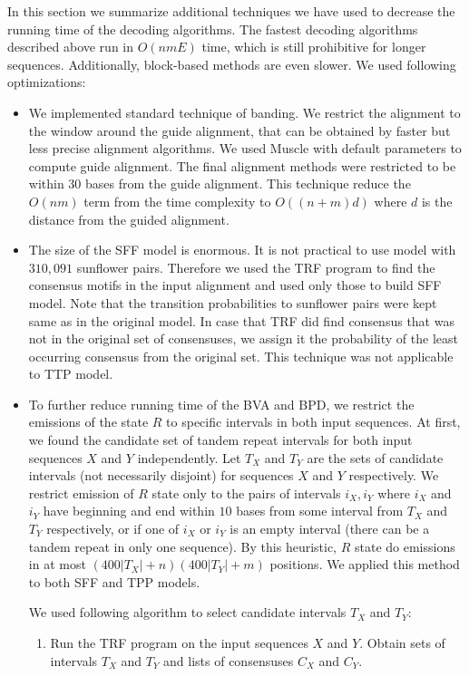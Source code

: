 In this section we summarize additional techniques we have used to decrease the
running time of the decoding algorithms. The fastest decoding algorithms described
above run in $O(nmE)$ time, which is still prohibitive for longer sequences.
Additionally, block-based methods are even slower. We used following
optimizations:
\begin{itemize}[itemsep=-1mm]
\item We implemented standard technique of banding. We restrict the alignment
to the window around the guide alignment, that can be obtained by faster but less
precise alignment algorithms. We used Muscle \cite{Edgar2004} with default
parameters to compute guide alignment. The final alignment methods were
restricted to be within 30 bases from the guide alignment. This technique
reduce the $O(nm)$ term from the time complexity to $O((n+m)d)$ where $d$ is
the distance from the guided alignment.

\item The size of the SFF model is enormous. It is not practical to use model
with $310,091$ sunflower pairs. Therefore we used the TRF program
\cite{Benson1999} to find the consensus motifs in the input alignment and used
only those to build SFF model. Note that the transition probabilities to
sunflower pairs were kept same as in the original model. In case that TRF did
find consensus that was not in the original set of consensuses, we assign it
the probability of the least occurring consensus from the original set. This
technique was not applicable to TTP model.

\item To further reduce running time of the BVA and BPD, we restrict the
emissions of the state $R$ to specific intervals in both input sequences. At
first, we found the candidate set of tandem repeat intervals for both input
sequences $X$ and $Y$ independently. Let $T_X$ and $T_Y$ are the sets of
candidate intervals (not necessarily disjoint) for sequences $X$ and $Y$
respectively. We restrict emission of $R$ state only to the pairs of intervals
$i_X, i_Y$ where $i_X$ and $i_Y$ have beginning and end within $10$ bases from
some interval from $T_X$ and $T_Y$ respectively, or if one of $i_X$ or $i_Y$ is
an empty interval (there can be a tandem repeat in only one sequence).  By this
heuristic, $R$ state do emissions in at most $(400|T_X|+n)(400|T_Y|+m)$
positions. We applied this method to both SFF and TPP models.

We used following algorithm to select candidate intervals $T_X$ and $T_Y$:
\begin{enumerate}[itemsep=-1mm]
\item Run the TRF program on the input sequences $X$ and $Y$. Obtain sets of
intervals $T_X$ and $T_Y$ and lists of consensuses $C_X$ and $C_Y$.


\end{enumerate}
\end{itemize}
